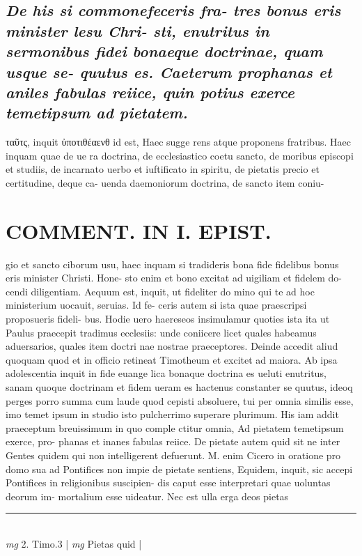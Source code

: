 \documentclass{article}
\begin{document}
\begin{pages}
\subsection*{\textit{De his si commonefeceris fra- tres bonus eris minister lesu Chri- sti, enutritus in sermonibus fidei bonaeque doctrinae, quam usque se- quutus es. Caeterum prophanas et aniles fabulas reiice, quin potius exerce temetipsum ad pietatem. }}\pstart ταῦτς, inquit ὐποτιθέαενθ id est, Haec sugge rens atque proponens fratribus. Haec inquam quae de ue ra doctrina, de ecclesiastico coetu sancto, de moribus episcopi et studiis, de incarnato uerbo et iuftificato in spiritu, de pietatis precio et certitudine, deque ca- uenda daemoniorum doctrina, de sancto item coniu-  \pend
\section*{COMMENT. IN I. EPIST. }\pstart gio et sancto ciborum usu, haec inquam si tradideris bona fide fidelibus bonus eris minister Christi. Hone- sto enim et bono excitat ad uigiliam et fidelem do- cendi diligentiam. Aequum est, inquit, ut fideliter do mino qui te ad hoc ministerium uocauit, seruias. Id fe- ceris autem si ista quae praescripsi proposueris fideli- bus. Hodie uero haereseos insimulamur quoties ista ita ut Paulus praecepit tradimus ecclesiis: unde coniicere licet quales habeamus aduersarios, quales item doctri nae nostrae praeceptores. Deinde accedit aliud quoquam quod et in officio retineat Timotheum et excitet ad maiora. Ab ipsa adolescentia inquit in fide euange lica bonaque doctrina es ueluti enutritus, sanam quoque  doctrinam et fidem ueram es hactenus constanter se quutus, ideoq perges porro summa cum laude quod cepisti absoluere, tui per omnia similis esse, imo temet ipsum in studio isto pulcherrimo superare plurimum. His iam addit praeceptum breuissimum in quo comple ctitur omnia, Ad pietatem temetipsum exerce, pro- phanas et inanes fabulas reiice. De pietate autem quid sit ne inter Gentes quidem qui non intelligerent defuerunt. M. enim Cicero in oratione pro domo sua ad Pontifices non impie de pietate sentiens, Equidem, inquit, sic accepi Pontifices in religionibus suscipien- dis caput esse interpretari quae uoluntas deorum im- mortalium esse uideatur. Nec est ulla erga deos pietas  \pend
\vspace{0.5cm}\noindent
\vspace{0.2cm}\rule{1cm}{0.2pt}\\ 
\hspace{0.2cm}\textit{mg}
\footnotesize 2. Timo.3 
\normalsize| 
\hspace{0.2cm}\textit{mg}
\footnotesize Pietas quid 
\normalsize| 

\end{pages}
\end{document}
